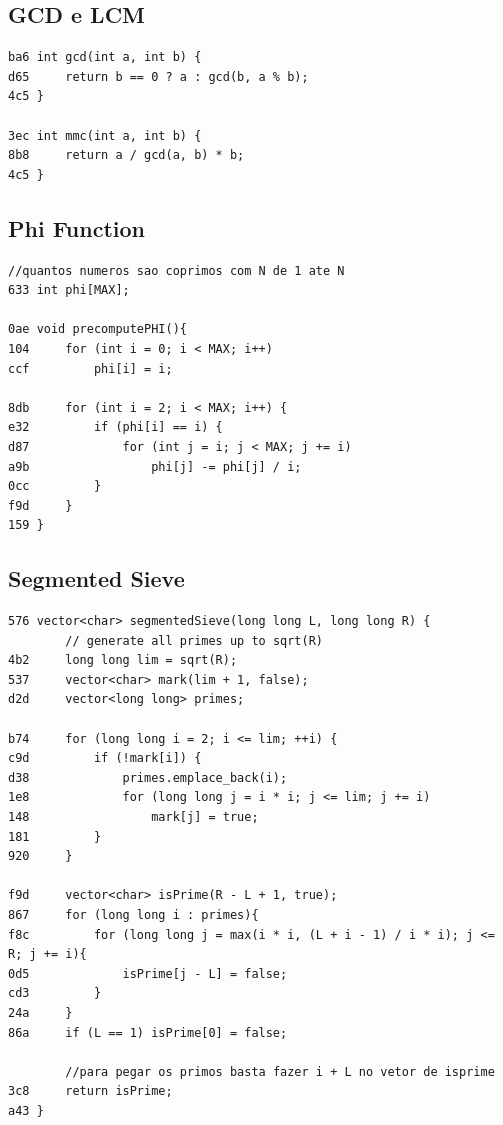 \documentclass[11pt, a4paper, twoside]{article}
\begin{document}
{\begin{lstlisting}
\end{lstlisting}

\subsection{GCD e LCM}
\begin{lstlisting}
ba6 int gcd(int a, int b) {
d65     return b == 0 ? a : gcd(b, a % b);
4c5 }

3ec int mmc(int a, int b) {
8b8     return a / gcd(a, b) * b;
4c5 }
\end{lstlisting}

\subsection{Phi Function}
\begin{lstlisting}
//quantos numeros sao coprimos com N de 1 ate N
633 int phi[MAX];

0ae void precomputePHI(){
104     for (int i = 0; i < MAX; i++)
ccf         phi[i] = i;
    
8db     for (int i = 2; i < MAX; i++) {
e32         if (phi[i] == i) {
d87             for (int j = i; j < MAX; j += i)
a9b                 phi[j] -= phi[j] / i;
0cc         }
f9d     }
159 }
\end{lstlisting}

\subsection{Segmented Sieve}
\begin{lstlisting}
576 vector<char> segmentedSieve(long long L, long long R) {
        // generate all primes up to sqrt(R)
4b2     long long lim = sqrt(R);
537     vector<char> mark(lim + 1, false);
d2d     vector<long long> primes;
    
b74     for (long long i = 2; i <= lim; ++i) {
c9d         if (!mark[i]) {
d38             primes.emplace_back(i);
1e8             for (long long j = i * i; j <= lim; j += i)
148                 mark[j] = true;
181         }
920     }
    
f9d     vector<char> isPrime(R - L + 1, true);
867     for (long long i : primes){
f8c         for (long long j = max(i * i, (L + i - 1) / i * i); j <= R; j += i){       
0d5             isPrime[j - L] = false;
cd3         }
24a     }
86a     if (L == 1) isPrime[0] = false;
        
        //para pegar os primos basta fazer i + L no vetor de isprime 
3c8     return isPrime;
a43 }
\end{lstlisting}

}
\end{document}

